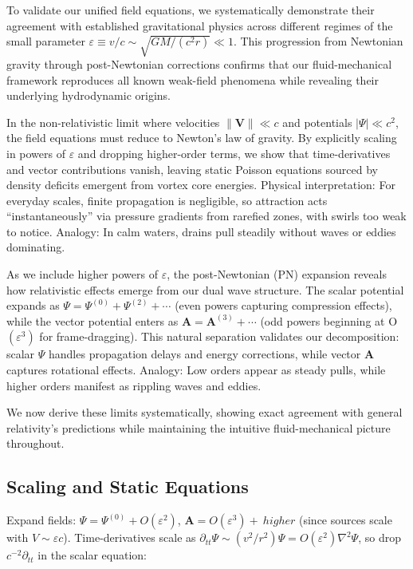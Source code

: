 \documentclass{article}
\begin{document}
To validate our unified field equations, we systematically demonstrate their agreement with established gravitational physics across different regimes of the small parameter $\varepsilon \equiv v/c \sim \sqrt{GM/(c^2 r)} \ll 1$. This progression from Newtonian gravity through post-Newtonian corrections confirms that our fluid-mechanical framework reproduces all known weak-field phenomena while revealing their underlying hydrodynamic origins.

In the non-relativistic limit where velocities $\|\mathbf{V}\| \ll c$ and potentials $|\Psi| \ll c^2$, the field equations must reduce to Newton's law of gravity. By explicitly scaling in powers of $\varepsilon$ and dropping higher-order terms, we show that time-derivatives and vector contributions vanish, leaving static Poisson equations sourced by density deficits emergent from vortex core energies. Physical interpretation: For everyday scales, finite propagation is negligible, so attraction acts ``instantaneously'' via pressure gradients from rarefied zones, with swirls too weak to notice. Analogy: In calm waters, drains pull steadily without waves or eddies dominating.

As we include higher powers of $\varepsilon$, the post-Newtonian (PN) expansion reveals how relativistic effects emerge from our dual wave structure. The scalar potential expands as $\Psi = \Psi^{(0)} + \Psi^{(2)} + \cdots$ (even powers capturing compression effects), while the vector potential enters as $\mathbf{A} = \mathbf{A}^{(3)} + \cdots$ (odd powers beginning at O$(\varepsilon^3)$ for frame-dragging). This natural separation validates our decomposition: scalar $\Psi$ handles propagation delays and energy corrections, while vector $\mathbf{A}$ captures rotational effects. Analogy: Low orders appear as steady pulls, while higher orders manifest as rippling waves and eddies.

We now derive these limits systematically, showing exact agreement with general relativity's predictions while maintaining the intuitive fluid-mechanical picture throughout.

\subsection{Scaling and Static Equations}

Expand fields: $\Psi = \Psi^{(0)} + O(\varepsilon^2)$, $\mathbf{A} = O(\varepsilon^3) + \ higher$ (since sources scale with $V \sim \varepsilon c$). Time-derivatives scale as $\partial_{tt} \Psi \sim (v^2 / r^2) \Psi = O(\varepsilon^2) \nabla^2 \Psi$, so drop $c^{-2} \partial_{tt}$ in the scalar equation:
\end{document}

